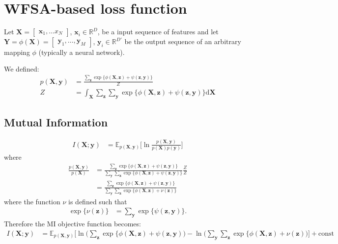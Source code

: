 \section{WFSA-based loss function}

Let $\mathbf{X} = \begin{bmatrix} \mathbf{x}_1, \dots{x}_N \end{bmatrix}$, $\mathbf{x}_i \in \mathbb{R}^D$, be a input sequence of features and let $\mathbf{Y} = \phi(\mathbf{X}) = \begin{bmatrix} \mathbf{y}_1, \dots, \mathbf{y}_M \end{bmatrix}$, $\mathbf{y}_i \in \mathbb{R}^{D'}$ be the output sequence of an arbitrary mapping $\phi$ (typically a neural network).

We defined:
\begin{align}
    p(\mathbf{X}, \mathbf{y}) &= \frac{\sum_{\mathbf{z}}\exp \{ \phi(\mathbf{X}, \mathbf{z}) + \psi(\mathbf{z}, \mathbf{y}) \} }{Z} \\
    Z &= \int_{\mathbf{X}} \sum_{\mathbf{z}} \sum_\mathbf{y} \exp \{ \phi(\mathbf{X}, \mathbf{z}) + \psi(\mathbf{z}, \mathbf{y}) \} \text{d}\mathbf{X}
\end{align}

\subsection{Mutual Information}

\begin{align}
    I(\mathbf{X}; \mathbf{y}) &= \mathbb{E}_{p(\mathbf{X}, \mathbf{y})} \Big[ \ln \frac{p(\mathbf{X}, \mathbf{y})}{p(\mathbf{X})p(\mathbf{y})} \Big]
\end{align}
where
\begin{align}
     \frac{p(\mathbf{X}, \mathbf{y})}{p(\mathbf{X})} &= \frac{\sum_{\mathbf{z}}\exp \{ \phi(\mathbf{X}, \mathbf{z}) + \psi(\mathbf{z}, \mathbf{y}) \} }{\sum_{\mathbf{y}} \sum_{\mathbf{z}}\exp \{ \phi(\mathbf{X}, \mathbf{z}) + \psi(\mathbf{z}, \mathbf{y}) \}} \frac{Z}{Z} \\
     &= \frac{\sum_{\mathbf{z}}\exp \{ \phi(\mathbf{X}, \mathbf{z}) + \psi(\mathbf{z}, \mathbf{y}) \} }{\sum_{\mathbf{y}} \sum_{\mathbf{z}}\exp \{ \phi(\mathbf{X}, \mathbf{z}) + \nu(\mathbf{z}) \}}
\end{align}
where the function $\nu$ is defined such that
\begin{align}
     \exp \{ \nu(\mathbf{z}) \} &= \sum_{\mathbf{y}} \exp \{ \psi(\mathbf{z}, \mathbf{y}) \}.
\end{align}
Therefore the MI objective function becomes:
\begin{align}
    I(\mathbf{X}; \mathbf{y}) &= \mathbb{E}_{p(\mathbf{X}, \mathbf{y})} \Big[\ln \Big( \sum_{\mathbf{z}}\exp \{ \phi(\mathbf{X}, \mathbf{z}) + \psi(\mathbf{z}, \mathbf{y}) \Big) - \ln \Big( \sum_{\mathbf{y}} \sum_{\mathbf{z}}\exp \{ \phi(\mathbf{X}, \mathbf{z}) + \nu(\mathbf{z}) \Big)  \Big] + \text{const}
\end{align}